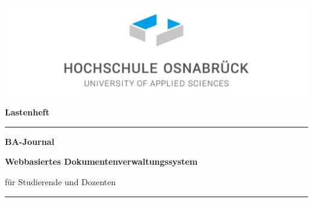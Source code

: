 \thispagestyle{empty}

\begin{center}
\includegraphics[scale=0.75]{Pictures/HS-OS-Logo-Standard-rgb.jpg}
\end{center}

\vspace*{3\baselineskip}
\begin{center}
{\Large\bf Lastenheft}
\end{center}

\vspace*{3\baselineskip}

\hrule
\begin{center}
{\huge\bf BA-Journal}

\vspace*{\baselineskip}

{\Large\bf Webbasiertes Dokumentenverwaltungssystem 

für Studierende und Dozenten}
\end{center}
\hrule

\vspace*{10\baselineskip}

